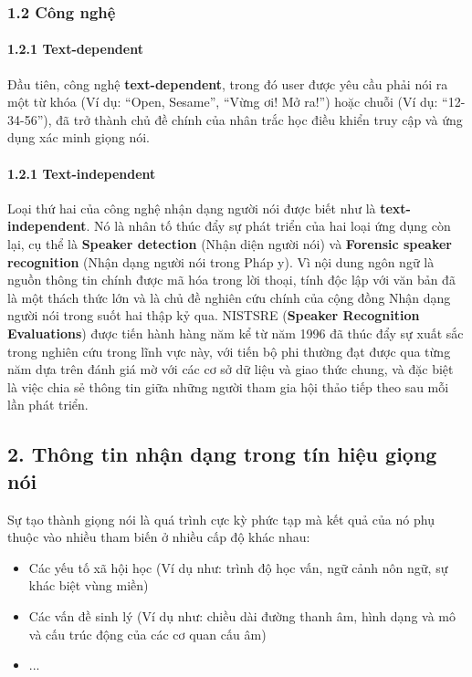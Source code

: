 \documentclass{article}
\begin{document}
	\subsubsection{1.2 Công nghệ}
		
	\paragraph{1.2.1 Text-dependent}
	Đầu tiên, công nghệ \textbf{text-dependent}, trong đó user được yêu cầu phải nói ra một từ khóa (Ví dụ: “Open, Sesame”, “Vừng ơi! Mở ra!”) hoặc chuỗi (Ví dụ: “12-34-56”), đã trở thành chủ đề chính của nhân trắc học điều khiển truy cập và ứng dụng xác minh giọng nói.
	
	\paragraph{1.2.1 Text-independent}
	Loại thứ hai của công nghệ nhận dạng người nói được biết như là \textbf{text-independent}. Nó là nhân tố thúc đẩy sự phát triển của hai loại ứng dụng còn lại, cụ thể là \textbf{Speaker detection} (Nhận diện người nói) và \textbf{Forensic speaker recognition} (Nhận dạng người nói trong Pháp y). Vì nội dung ngôn ngữ là nguồn thông tin chính được mã hóa trong lời thoại, tính độc lập với văn bản đã là một thách thức lớn và là chủ đề nghiên cứu chính của cộng đồng Nhận dạng người nói trong suốt hai thập kỷ qua. NISTSRE (\textbf{Speaker Recognition Evaluations}) được tiến hành hàng năm kể từ năm 1996 đã thúc đẩy sự xuất sắc trong nghiên cứu trong lĩnh vực này, với tiến bộ phi thường đạt được qua từng năm dựa trên đánh giá mờ với các cơ sở dữ liệu và giao thức chung, và đặc biệt là việc chia sẻ thông tin giữa những người tham gia hội thảo tiếp theo sau mỗi lần phát triển.
	
	\subsection{2. Thông tin nhận dạng trong tín hiệu giọng nói}
	\qquad Sự tạo thành giọng nói là quá trình cực kỳ phức tạp mà kết quả của nó phụ thuộc vào nhiều tham biến ở nhiều cấp độ khác nhau:
	\begin{itemize}
		\item Các yếu tố xã hội học (Ví dụ như: trình độ học vấn, ngữ cảnh nôn ngữ, sự khác biệt vùng miền)
		\item Các vấn đề sinh lý (Ví dụ như: chiều dài đường thanh âm, hình dạng và mô và cấu trúc động của các cơ quan cấu âm)
		\item ...
	\end{itemize}
	
\end{document}
